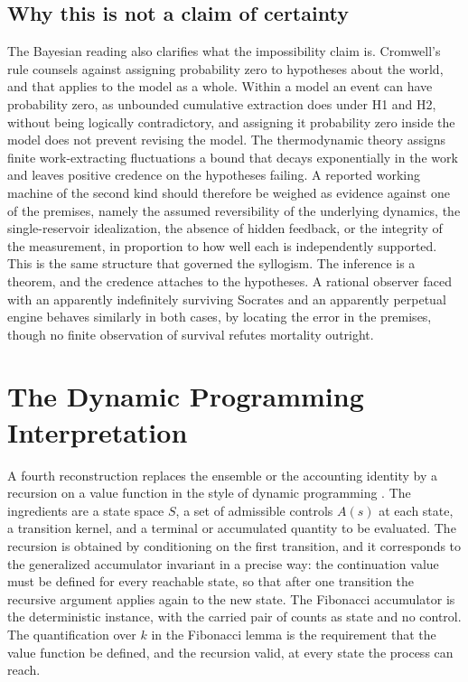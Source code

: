 \documentclass[11pt]{article}
\theoremstyle{definition}
\theoremstyle{remark}
\begin{document}
\subsection{Why this is not a claim of certainty}

The Bayesian reading also clarifies what the impossibility claim is. Cromwell's rule counsels against assigning probability zero to hypotheses about the world, and that applies to the model as a whole. Within a model an event can have probability zero, as unbounded cumulative extraction does under H1 and H2, without being logically contradictory, and assigning it probability zero inside the model does not prevent revising the model. The thermodynamic theory assigns finite work-extracting fluctuations a bound that decays exponentially in the work and leaves positive credence on the hypotheses failing. A reported working machine of the second kind should therefore be weighed as evidence against one of the premises, namely the assumed reversibility of the underlying dynamics, the single-reservoir idealization, the absence of hidden feedback, or the integrity of the measurement, in proportion to how well each is independently supported. This is the same structure that governed the syllogism. The inference is a theorem, and the credence attaches to the hypotheses. A rational observer faced with an apparently indefinitely surviving Socrates and an apparently perpetual engine behaves similarly in both cases, by locating the error in the premises, though no finite observation of survival refutes mortality outright.

\section{The Dynamic Programming Interpretation}

A fourth reconstruction replaces the ensemble or the accounting identity by a recursion on a value function in the style of dynamic programming \cite{bellman1957}. The ingredients are a state space $S$, a set of admissible controls $A(s)$ at each state, a transition kernel, and a terminal or accumulated quantity to be evaluated. The recursion is obtained by conditioning on the first transition, and it corresponds to the generalized accumulator invariant in a precise way: the continuation value must be defined for every reachable state, so that after one transition the recursive argument applies again to the new state. The Fibonacci accumulator is the deterministic instance, with the carried pair of counts as state and no control. The quantification over $k$ in the Fibonacci lemma is the requirement that the value function be defined, and the recursion valid, at every state the process can reach.
\end{document}
